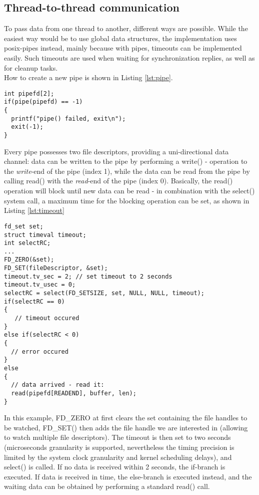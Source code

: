 \subsection{Thread-to-thread communication}
To pass data from one thread to another, different ways are possible. While the easiest way would be to use global data structures, the implementation uses 
\gls{posix}-pipes instead, mainly because with pipes, timeouts can be implemented easily. Such timeouts are used when waiting for synchronization replies, as well as for 
cleanup tasks.
\\
How to create a new pipe is shown in Listing \ref{lst:pipe}.
\begin{lstlisting}[style=cStyle, caption={Creating a pipe},label=lst:pipe]
int pipefd[2];
if(pipe(pipefd) == -1)
{
  printf("pipe() failed, exit\n");
  exit(-1);
}
\end{lstlisting}
Every pipe possesses two file descriptors, providing a uni-directional data channel: data can be written to the pipe by performing a write() - operation to the \textit{write}-end of the
pipe (index 1), while the data can be read from the pipe by calling read() with the \textit{read}-end of the pipe (index 0). Basically, the read() operation will block until new data can be read - in 
combination with the select() system call, a maximum time for the blocking operation can be set, as shown in Listing \ref{lst:timeout}
\begin{lstlisting}[style=cStyle,caption={Blocking read with timeout},label=lst:timeout]
fd_set set;
struct timeval timeout;
int selectRC;
...
FD_ZERO(&set);
FD_SET(fileDescriptor, &set);
timeout.tv_sec = 2;	// set timeout to 2 seconds
timeout.tv_usec = 0;
selectRC = select(FD_SETSIZE, set, NULL, NULL, timeout);
if(selectRC == 0)
{
   // timeout occured
}
else if(selectRC < 0)
{
  // error occured
}
else
{
  // data arrived - read it:
  read(pipefd[READEND], buffer, len);
}
\end{lstlisting}
In this example, FD\_ZERO at first clears the set containing the file handles to be watched, FD\_SET() then adds the file handle we are interested in (allowing to watch multiple file
descriptors). The timeout is then set to two seconds 
(microseconds granularity is supported, nevertheless the timing precision is limited by the system clock granularity and kernel scheduling delays), and select() is called. If no data is
received within 2 seconds, the if-branch is executed. If data is received in time, the else-branch is executed instead, and the waiting data can be obtained by performing a standard
read() call.

